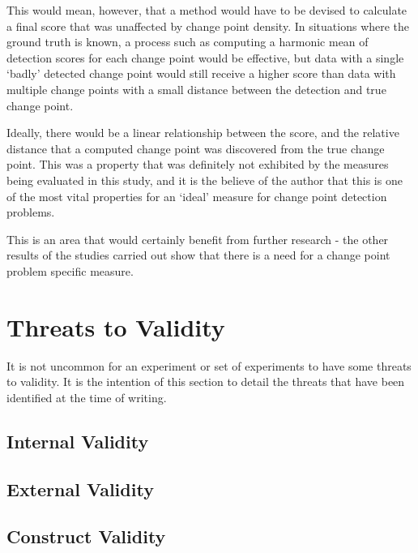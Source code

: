\documentclass[../main.tex]{subfiles}
\begin{document}
This would mean, however, that a method would have to be devised to calculate a final score that was unaffected by change point density. In situations where the ground truth is known, a process such as computing a harmonic mean of detection scores for each change point would be effective, but data with a single `badly' detected change point would still receive a higher score than data with multiple change points with a small distance between the detection and true change point.

Ideally, there would be a linear relationship between the score, and the relative distance that a computed change point was discovered from the true change point. This was a property that was definitely not exhibited by the measures being evaluated in this study, and it is the believe of the author that this is one of the most vital properties for an `ideal' measure for change point detection problems.

This is an area that would certainly benefit from further research - the other results of the studies carried out show that there is a need for a change point problem specific measure.

\section{Threats to Validity}
\label{threats}

It is not uncommon for an experiment or set of experiments to have some threats to validity. It is the intention of this section to detail the threats that have been identified at the time of writing.

\subsection{Internal Validity}

\subsection{External Validity}

\subsection{Construct Validity}
\end{document}
